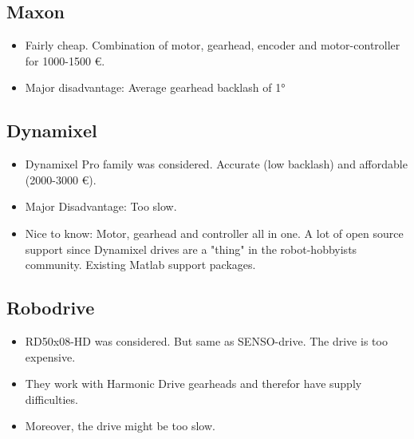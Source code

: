 \documentclass[a4paper]{article}
\begin{document}
\subsection{Maxon}

\begin{itemize}

\item Fairly cheap. Combination of motor, gearhead, encoder and motor-controller for 1000-1500 \euro.

\item Major disadvantage: Average gearhead backlash of 1°

\end{itemize}

\subsection{Dynamixel}

\begin{itemize}

\item Dynamixel Pro family was considered. Accurate (low backlash) and affordable (2000-3000 \euro).

\item Major Disadvantage: Too slow.

\item Nice to know: Motor, gearhead and controller all in one. A lot of open source support since Dynamixel drives are a "thing" in the robot-hobbyists community. Existing Matlab support packages. 

\end{itemize}

\subsection{Robodrive}

\begin{itemize}

\item RD50x08-HD was considered. But same as SENSO-drive. The drive is too expensive.

\item They work with Harmonic Drive gearheads and therefor have supply difficulties.

\item Moreover, the drive might be too slow.

\end{itemize}
\end{document}
